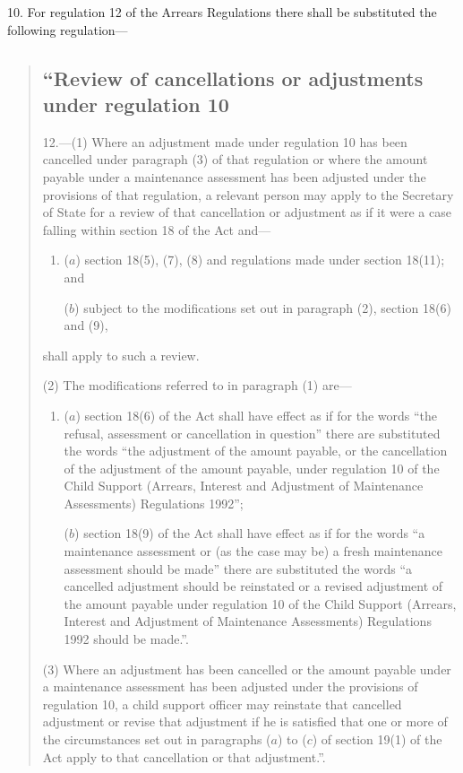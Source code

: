 \documentclass[12pt,a4paper]{article}
\begin{document}
10.  For regulation 12 of the Arrears Regulations there shall be substituted the following regulation—
\begin{quotation}
\subsection*{\sloppy “Review of cancellations or adjustments under regulation 10}

\begin{sloppypar}
12.—(1) Where an adjustment made under regulation 10 has been cancelled under paragraph (3) of that regulation or where the amount payable under a maintenance assessment has been adjusted under the provisions of that regulation, a relevant person may apply to the Secretary of State for a review of that cancellation or adjustment as if it were a case falling within section 18 of the Act and—
\end{sloppypar}
\begin{enumerate}\item[]
($a$) section 18(5), (7), (8) and regulations made under section 18(11); and

($b$) subject to the modifications set out in paragraph (2), section 18(6) and (9),
\end{enumerate}
shall apply to such a review.

(2) The modifications referred to in paragraph (1) are—
\begin{enumerate}\item[]
($a$) section 18(6) of the Act shall have effect as if for the words “the refusal, assessment or cancellation in question” there are substituted the words “the adjustment of the amount payable, or the cancellation of the adjustment of the amount payable, under regulation 10 of the Child Support (Arrears, Interest and Adjustment of Maintenance Assessments) Regulations 1992”;

($b$) section 18(9) of the Act shall have effect as if for the words “a maintenance assessment or (as the case may be) a fresh maintenance assessment should be made” there are substituted the words “a cancelled adjustment should be reinstated or a revised adjustment of the amount payable under regulation 10 of the Child Support (Arrears, Interest and Adjustment of Maintenance Assessments) Regulations 1992 should be made.”.
\end{enumerate}

(3) Where an adjustment has been cancelled or the amount payable under a maintenance assessment has been adjusted under the provisions of regulation 10, a child support officer may reinstate that cancelled adjustment or revise that adjustment if he is satisfied that one or more of the circumstances set out in paragraphs ($a$) to ($c$) of section 19(1) of the Act apply to that cancellation or that adjustment.”.
\end{quotation}
\end{document}
